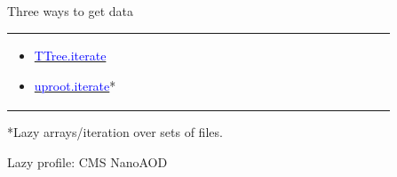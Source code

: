 \documentclass[aspectratio=169]{beamer}
\begin{document}
\begin{frame}{Three ways to get data}
\begin{center}
\begin{tabular}{p{0.3\linewidth} c p{0.3\linewidth} c p{0.3\linewidth}}
\begin{minipage}{\linewidth}
\vspace{0.5\baselineskip}
\begin{itemize}
\item \href{https://uproot.readthedocs.io/en/latest/ttree-handling.html\#iterate}{\textcolor{blue}{TTree.iterate}}
\item \href{https://uproot.readthedocs.io/en/latest/opening-files.html\#uproot-iterate}{\textcolor{blue}{uproot.iterate}}*
\vspace{3.7\baselineskip}
\end{itemize}
\end{minipage}
\end{tabular}
\end{center}

\vspace{0.25 cm}
*Lazy arrays/iteration over sets of files.
\end{frame}

\begin{frame}{Lazy profile: CMS NanoAOD}
\end{frame}
\end{document}

